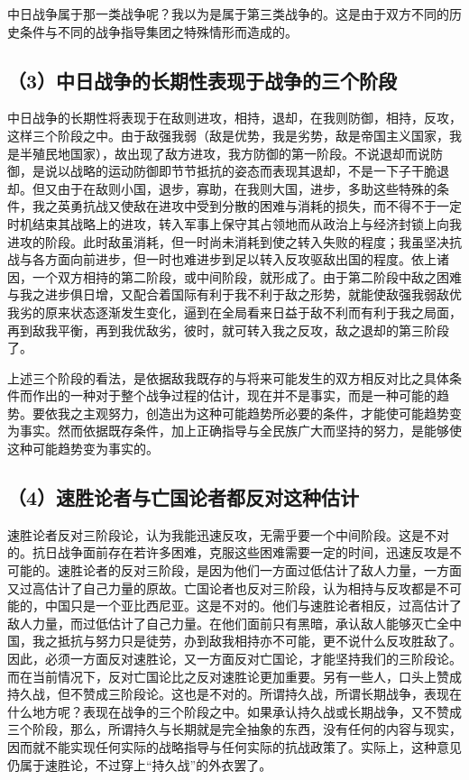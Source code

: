 中日战争属于那一类战争呢？我以为是属于第三类战争的。这是由于双方不同的历史条件与不同的战争指导集团之特殊情形而造成的。

\subsection{（3）中日战争的长期性表现于战争的三个阶段}

中日战争的长期性将表现于在敌则进攻，相持，退却，在我则防御，相持，反攻，这样三个阶段之中。由于敌强我弱（敌是优势，我是劣势，敌是帝国主义国家，我是半殖民地国家），故出现了敌方进攻，我方防御的第一阶段。不说退却而说防御，是说以战略的运动防御即节节抵抗的姿态而表现其退却，不是一下子干脆退却。但又由于在敌则小国，退步，寡助，在我则大国，进步，多助这些特殊的条件，我之英勇抗战又使敌在进攻中受到分散的困难与消耗的损失，而不得不于一定时机结束其战略上的进攻，转入军事上保守其占领地而从政治上与经济封锁上向我进攻的阶段。此时敌虽消耗，但一时尚未消耗到使之转入失败的程度；我虽坚决抗战与各方面向前进步，但一时也难进步到足以转入反攻驱敌出国的程度。依上诸因，一个双方相持的第二阶段，或中间阶段，就形成了。由于第二阶段中敌之困难与我之进步俱日增，又配合着国际有利于我不利于敌之形势，就能使敌强我弱敌优我劣的原来状态逐渐发生变化，逼到在全局看来日益于敌不利而有利于我之局面，再到敌我平衡，再到我优敌劣，彼时，就可转入我之反攻，敌之退却的第三阶段了。

上述三个阶段的看法，是依据敌我既存的与将来可能发生的双方相反对比之具体条件而作出的一种对于整个战争过程的估计，现在并不是事实，而是一种可能的趋势。要依我之主观努力，创造出为这种可能趋势所必要的条件，才能使可能趋势变为事实。然而依据既存条件，加上正确指导与全民族广大而坚持的努力，是能够使这种可能趋势变为事实的。

\subsection{（4）速胜论者与亡国论者都反对这种估计}

速胜论者反对三阶段论，认为我能迅速反攻，无需乎要一个中间阶段。这是不对的。抗日战争面前存在若许多困难，克服这些困难需要一定的时间，迅速反攻是不可能的。速胜论者的反对三阶段，是因为他们一方面过低估计了敌人力量，一方面又过高估计了自己力量的原故。亡国论者也反对三阶段，认为相持与反攻都是不可能的，中国只是一个亚比西尼亚。这是不对的。他们与速胜论者相反，过高估计了敌人力量，而过低估计了自己力量。在他们面前只有黑暗，承认敌人能够灭亡全中国，我之抵抗与努力只是徒劳，办到敌我相持亦不可能，更不说什么反攻胜敌了。因此，必须一方面反对速胜论，又一方面反对亡国论，才能坚持我们的三阶段论。而在当前情况下，反对亡国论比之反对速胜论更加重要。另有一些人，口头上赞成持久战，但不赞成三阶段论。这也是不对的。所谓持久战，所谓长期战争，表现在什么地方呢？表现在战争的三个阶段之中。如果承认持久战或长期战争，又不赞成三个阶段，那么，所谓持久与长期就是完全抽象的东西，没有任何的内容与现实，因而就不能实现任何实际的战略指导与任何实际的抗战政策了。实际上，这种意见仍属于速胜论，不过穿上“持久战”的外衣罢了。


